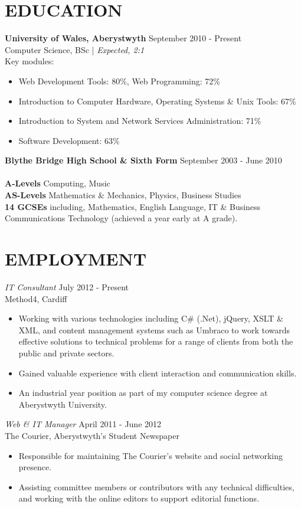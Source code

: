 \documentclass[line,margin]{res}
\begin{document}
\begin{resume}
\section{EDUCATION} {\bf University of Wales, Aberystwyth} \hfill September 2010 - Present\\
               Computer Science, BSc | {\sl Expected, 2:1}\\
Key modules: 
\begin{itemize} \itemsep -2pt
\item Web Development Tools: 80\%, Web Programming: 72\%
\item Introduction to Computer Hardware, Operating Systems \& Unix Tools: 67\%
\item Introduction to System and Network Services Administration: 71\%
\item Software Development: 63\%\\
\end{itemize}
{\bf Blythe Bridge High School \& Sixth Form} \hfill September 2003 - June 2010 \\ \\
{\bf A-Levels} Computing, Music\\
{\bf AS-Levels} Mathematics \& Mechanics, Physics, Business Studies\\
{\bf 14 GCSEs} including, Mathematics, English Language, IT \& Business Communications Technology (achieved a year early at A grade).

\newpage
\section{EMPLOYMENT}
	{\sl IT Consultant} \hfill July 2012 - Present \\
	Method4, Cardiff
	\begin{itemize} \itemsep -2pt
		\item Working with various technologies including C\# (.Net), jQuery, XSLT \& XML, and content management systems such as Umbraco to work towards effective solutions to technical problems for a range of clients from both the public and private sectors.
		\item Gained valuable experience with client interaction and communication skills.
		\item An industrial year position as part of my computer science degree at Aberystwyth University.
	\end{itemize}

	{\sl Web \& IT Manager} \hfill April 2011 - June 2012 \\
	The Courier, Aberystwyth's Student Newspaper
	\begin{itemize} \itemsep -2pt
	\item Responsible for maintaining The Courier's website and social networking presence.
	\item Assisting committee members or contributors with any technical difficulties, and working with the online editors to support editorial functions.
	\end{itemize}


\end{resume}
\end{document}
